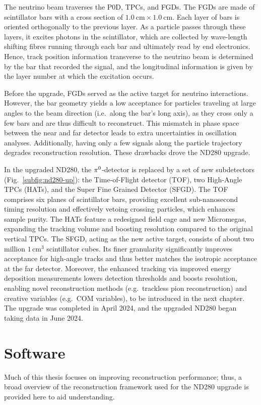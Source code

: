 The neutrino beam traverses the P0D, TPCs, and FGDs.
The FGDs are made of scintillator bars with a cross section of \(1.0~\mathrm{cm} \times 1.0~\mathrm{cm}\).
Each layer of bars is oriented orthogonally to the previous layer.
As a particle passes through these layers, it excites photons in the scintillator, which are collected by wave-length shifting fibres running through each bar and ultimately read by end electronics.
Hence, track position information transverse to the neutrino beam is determined by the bar that recorded the signal, and the longitudinal information is given by the layer number at which the excitation occurs.

Before the upgrade, FGDs served as the active target for neutrino interactions.
However, the bar geometry yields a low acceptance for particles traveling at large angles to the beam direction (i.e.\ along the bar’s long axis), as they cross only a few bars and are thus difficult to reconstruct.
This mismatch in phase space between the near and far detector leads to extra uncertainties in oscillation analyses.
Additionally, having only a few signals along the particle trajectory degrades reconstruction resolution.
These drawbacks drove the ND280 upgrade.

In the upgraded ND280, the \(\pi^0\)-detector is replaced by a set of new subdetectors (Fig.~\ref{subfig:nd280-up}): the Time-of-Flight detector (TOF), two High-Angle TPCs (HATs), and the Super Fine Grained Detector (SFGD).
The TOF comprises six planes of scintillator bars, providing excellent sub-nanosecond timing resolution and effectively vetoing crossing particles, which enhances sample purity.
The HATs feature a redesigned field cage and new Micromegas, expanding the tracking volume and boosting resolution compared to the original vertical TPCs.
The SFGD, acting as the new active target, consists of about two million \(1\,\mathrm{cm}^3\) scintillator cubes.
Its finer granularity significantly improves acceptance for high-angle tracks and thus better matches the isotropic acceptance at the far detector.
Moreover, the enhanced tracking via improved energy deposition measurements lowers detection thresholds and boosts resolution, enabling novel reconstruction methods (e.g.\ trackless pion reconstruction) and creative variables (e.g.\ COM variables), to be introduced in the next chapter.
The upgrade was completed in April 2024, and the upgraded ND280 began taking data in June 2024.

\section{Software}
\label{sec:t2k-sw}
Much of this thesis focuses on improving reconstruction performance; thus, a broad overview of the reconstruction framework used for the ND280 upgrade is provided here to aid understanding.

